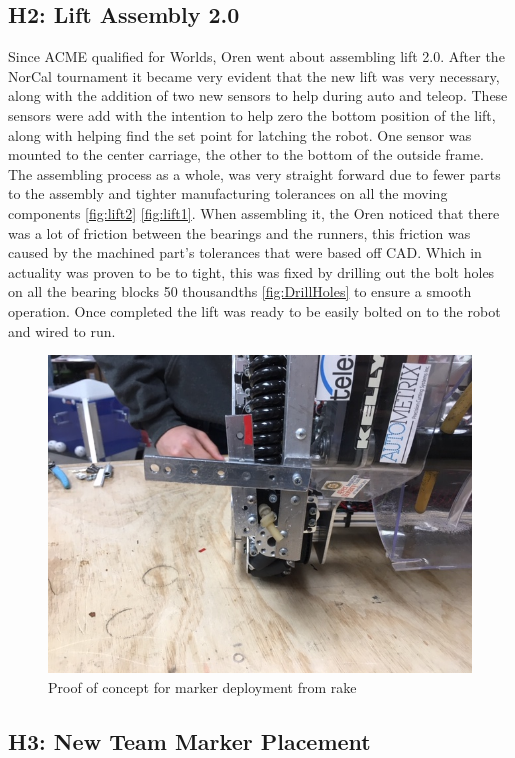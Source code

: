\documentclass{article}
\begin{document}
\subsection{H2: Lift Assembly 2.0}

Since ACME qualified for Worlds, Oren went about assembling lift 2.0. After the NorCal tournament it became very evident that the new lift was very necessary, along with the addition of two new sensors to help during auto and teleop. These sensors were add with the intention to help zero the bottom position of the lift, along with helping find the set point for latching the robot. One sensor was mounted to the center carriage, the other to the bottom of the outside frame. The assembling process as a whole, was very straight forward due to fewer parts to the assembly and tighter manufacturing tolerances on all the moving components \ref{fig:lift2} \ref{fig:lift1}. When assembling it, the Oren noticed that there was a lot of friction between the bearings and the runners, this friction was caused by the machined part's tolerances that were based off CAD. Which in actuality was proven to be to tight, this was fixed by drilling out the bolt holes on all the bearing blocks 50 thousandths \ref{fig:DrillHoles} to ensure a smooth operation. Once completed the lift was ready to be easily bolted on to the robot and wired to run.         

\begin{figure}
    \centering
    \includegraphics[width= 0.5 \textwidth]{27_03-04/images/rakemarker.JPG}
    \caption{Proof of concept for marker deployment from rake}
    \label{fig:Rake marker proof of concept}
\end{figure}

\subsection{H3: New Team Marker Placement}
\end{document}
